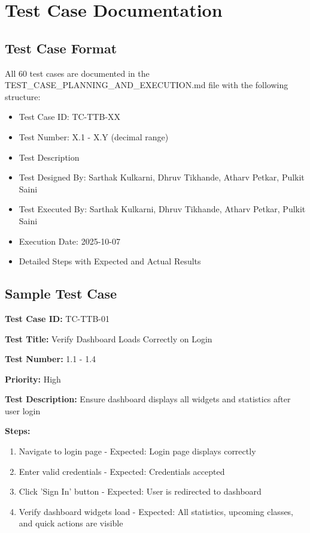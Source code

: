 \appendix
\chapter{Test Case Documentation}

\section{Test Case Format}
All 60 test cases are documented in the TEST\_CASE\_PLANNING\_AND\_EXECUTION.md file with the following structure:
\begin{itemize}[leftmargin=*]
    \item Test Case ID: TC-TTB-XX
    \item Test Number: X.1 - X.Y (decimal range)
    \item Test Description
    \item Test Designed By: Sarthak Kulkarni, Dhruv Tikhande, Atharv Petkar, Pulkit Saini
    \item Test Executed By: Sarthak Kulkarni, Dhruv Tikhande, Atharv Petkar, Pulkit Saini
    \item Execution Date: 2025-10-07
    \item Detailed Steps with Expected and Actual Results
\end{itemize}

\section{Sample Test Case}
\textbf{Test Case ID:} TC-TTB-01

\textbf{Test Title:} Verify Dashboard Loads Correctly on Login

\textbf{Test Number:} 1.1 - 1.4

\textbf{Priority:} High

\textbf{Test Description:} Ensure dashboard displays all widgets and statistics after user login

\textbf{Steps:}
\begin{enumerate}
    \item Navigate to login page - Expected: Login page displays correctly
    \item Enter valid credentials - Expected: Credentials accepted
    \item Click 'Sign In' button - Expected: User is redirected to dashboard
    \item Verify dashboard widgets load - Expected: All statistics, upcoming classes, and quick actions are visible
\end{enumerate}
